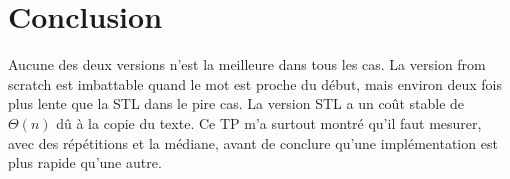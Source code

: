 \documentclass[11pt,a4paper]{article}
\begin{document}
\section{Conclusion}

Aucune des deux versions n'est la meilleure dans tous les cas. La version from scratch
est imbattable quand le mot est proche du début, mais environ deux fois plus lente que la STL
dans le pire cas. La version STL a un coût stable de $\Theta(n)$ dû à la copie du texte.
Ce TP m'a surtout montré qu'il faut mesurer, avec des répétitions et la médiane,
avant de conclure qu'une implémentation est plus rapide qu'une autre.
\end{document}
